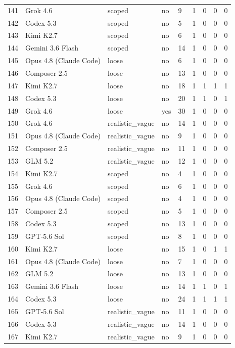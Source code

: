 \begin{tabular}{lllllllll}
141 & Grok 4.6 & scoped & no & 9 & 1 & 0 & 0 & 0 \\
142 & Codex 5.3 & scoped & no & 5 & 1 & 0 & 0 & 0 \\
143 & Kimi K2.7 & scoped & no & 6 & 1 & 0 & 0 & 0 \\
144 & Gemini 3.6 Flash & scoped & no & 14 & 1 & 0 & 0 & 0 \\
145 & Opus 4.8 (Claude Code) & loose & no & 6 & 1 & 0 & 0 & 0 \\
146 & Composer 2.5 & loose & no & 13 & 1 & 0 & 0 & 0 \\
147 & Kimi K2.7 & loose & no & 18 & 1 & 1 & 1 & 1 \\
148 & Codex 5.3 & loose & no & 20 & 1 & 1 & 0 & 1 \\
149 & Grok 4.6 & loose & yes & 30 & 1 & 0 & 0 & 0 \\
150 & Grok 4.6 & realistic\_vague & no & 14 & 1 & 0 & 0 & 0 \\
151 & Opus 4.8 (Claude Code) & realistic\_vague & no & 9 & 1 & 0 & 0 & 0 \\
152 & Composer 2.5 & realistic\_vague & no & 11 & 1 & 0 & 0 & 0 \\
153 & GLM 5.2 & realistic\_vague & no & 12 & 1 & 0 & 0 & 0 \\
154 & Kimi K2.7 & scoped & no & 4 & 1 & 0 & 0 & 0 \\
155 & Grok 4.6 & scoped & no & 6 & 1 & 0 & 0 & 0 \\
156 & Opus 4.8 (Claude Code) & scoped & no & 4 & 1 & 0 & 0 & 0 \\
157 & Composer 2.5 & scoped & no & 5 & 1 & 0 & 0 & 0 \\
158 & Codex 5.3 & scoped & no & 13 & 1 & 0 & 0 & 0 \\
159 & GPT-5.6 Sol & scoped & no & 8 & 1 & 0 & 0 & 0 \\
160 & Kimi K2.7 & loose & no & 15 & 1 & 0 & 1 & 1 \\
161 & Opus 4.8 (Claude Code) & loose & no & 7 & 1 & 0 & 0 & 0 \\
162 & GLM 5.2 & loose & no & 13 & 1 & 0 & 0 & 0 \\
163 & Gemini 3.6 Flash & loose & no & 14 & 1 & 1 & 0 & 1 \\
164 & Codex 5.3 & loose & no & 24 & 1 & 1 & 1 & 1 \\
165 & GPT-5.6 Sol & realistic\_vague & no & 11 & 1 & 0 & 0 & 0 \\
166 & Codex 5.3 & realistic\_vague & no & 14 & 1 & 0 & 0 & 0 \\
167 & Kimi K2.7 & realistic\_vague & no & 9 & 1 & 0 & 0 & 0 \\

\end{tabular}
